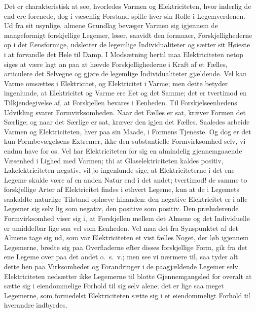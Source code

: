 \documentclass[12pt,a4paper]{book}
\begin{document}
Det er charakteristisk at see, hvorledes Varmen og Elektriciteten,
hvor inderlig de end ere forenede, dog i væsenlig Forstand spille hver
sin Rolle i Legemverdenen. Ud fra sit usynlige, almene Grundlag
bevæger Varmen sig igjennem de mangeformigt forskjellige Legemer,
løser, saavidt den formaaer, Forskjellighederne op i det Eensformige,
udsletter de legemlige Individualiteter og sætter sit Høieste i at
forvandle det Hele til Damp. I Modsætning hertil maa Elektriciteten
netop siges at være lagt an paa at hævde Forskjellighederne i Kraft af
et Fælles, articulere det Selvegne
og gjøre de legemlige Individualiteter gjældende. Vel kan Varme
omsættes i Elektricitet, og Elektricitet i Varme; men dette betyder
ingenlunde, at Elektricitet og Varme ere Eet og det Samme; det er
tvertimod en Tilkjendegivelse af, at Forskjellen bevares i Eenheden.
Til Forskjelseenhedens Udvikling svarer Formvirksomheden. Naar det
Fælles er sat, kræver Formen det Særlige; og naar det Særlige er sat,
kræver den igjen det Fælles. Saaledes arbeide Varmen og
Elektriciteten, hver paa sin Maade, i Formens Tjeneste. Og dog er det
kun Formbevægelsens Extremer, ikke den substantielle Formvirksomhed
selv, vi endnu have for os. Vel har Elektriciteten for sig en
almindelig gjennemgaaende Væsenhed i Lighed med Varmen; thi at
Glaselektriciteten kaldes positiv, Lakelektriciteten negativ, vil jo
ingenlunde sige, at Elektriciteterne i det ene Legeme skulde være af
en anden Natur end i det andet; tvertimod! de samme to forskjellige
Arter af Elektricitet findes i ethvert Legeme, kun at de i Legemets
saakaldte naturlige Tilstand ophæve hinanden: den negative
Elektricitet er i alle Legemer sig selv lig som negativ, den positive
som positiv. Den præluderende Formvirksomhed viser sig i, at
Forskjellen mellem det Almene og det Individuelle er umiddelbar lige
saa vel som Eenheden. Vel maa det fra Synspunktet af det Almene tage
sig ud, som var Elektriciteten et vist fælles Noget, der løb igjennem
Legemerne, bredte sig paa Overfladerne efter disses forskjellige Form,
gik fra det ene Legeme over paa det andet o.\ s.\ v.; men see vi
nærmere til, saa tyder alt dette hen paa Virksomheder og Forandringer
i de paagjældende Legemer selv. Elektriciteten nedsætter ikke
Legemerne til blotte Gjennemgangsled for overalt at sætte sig i
eiendommelige Forhold til sig selv alene; det er lige saa meget
Legemerne, som formedelst Elektriciteten sætte sig i et eiendommeligt
Forhold til hverandre indbyrdes.
\end{document}
